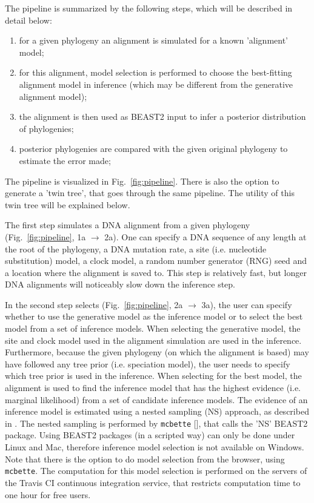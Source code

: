 \documentclass{article}
\begin{document}
The pipeline is summarized by the following steps, which will be described in detail below:
\begin{enumerate}
    \item for a given phylogeny an alignment is simulated for a known 'alignment' model;
    \item for this alignment, model selection is performed to choose the best-fitting alignment model in inference (which may be different from the generative alignment model);
    \item the alignment is then used as BEAST2 input to infer a posterior distribution of phylogenies;
    \item posterior phylogenies are compared with the given original phylogeny to estimate the error made;
\end{enumerate}
The pipeline is visualized in Fig.~\ref{fig:pipeline}.
There is also the option to generate a 'twin tree',
that goes through the same pipeline. The utility of this twin tree will be explained below.

The first step simulates a DNA alignment from a given 
phylogeny (Fig.~\ref{fig:pipeline}, 1a $\rightarrow$ 2a).
One can specify a DNA sequence
of any length at the root of the phylogeny, a DNA mutation rate, a
site (i.e. nucleotide substitution) model, 
a clock model, a random number generator (RNG) seed and a location
where the alignment is saved to. This step is relatively fast, but longer
DNA alignments will noticeably slow down the inference step.

In the second step selects (Fig.~\ref{fig:pipeline}, 2a $\rightarrow$ 3a), the user can specify whether to use the generative model as the inference model or to select the best model from a set of inference models. 
When selecting the generative model, the site and clock model used in the alignment simulation are used in the inference. Furthermore, because the given phylogeny (on which the alignment is based)
may have followed any tree prior (i.e. speciation model), the user needs
to specify which tree prior is used in the inference. 
When selecting for the best
model, the alignment is used to find the inference model that has the
highest evidence (i.e. marginal likelihood) from a set of candidate inference models.
The evidence of an inference model is estimated using a nested sampling (NS)
approach, as described in \cite{maturana2018model}. The nested sampling is
performed by \verb;mcbette; [\cite{mcbette}], that calls the 'NS' BEAST2 package. 
Using BEAST2 packages (in a scripted way) can only be done under Linux and Mac,
therefore inference model selection is not available on Windows. Note that
there is the option to do model selection from the browser, 
using \verb;mcbette;. The computation for this model selection is 
performed on the servers of the Travis CI continuous integration service,
that restricts computation time to one hour for free users.
\end{document}

